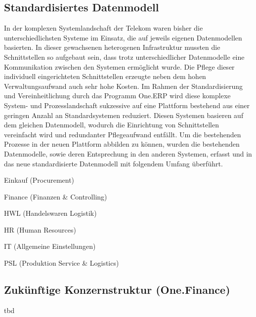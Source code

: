 \subsection{Standardisiertes Datenmodell}
In der komplexen Systemlandschaft der Telekom waren bisher die unterschiedlichsten Systeme im Einsatz, die auf jeweils eigenen Datenmodellen basierten. 
In dieser gewachsenen heterogenen Infrastruktur mussten die Schnittstellen so aufgebaut sein, dass trotz unterschiedlicher Datenmodelle eine Kommunikation zwischen den Systemen ermöglicht wurde. Die Pflege dieser individuell eingerichteten Schnittstellen erzeugte neben dem hohen Verwaltungsaufwand auch sehr hohe Kosten.
Im Rahmen der Standardisierung und Vereinheitlichung durch das Programm One.ERP wird diese komplexe System- und Prozesslandschaft sukzessive auf eine Plattform bestehend aus einer geringen Anzahl an Standardsystemen reduziert. Diesen Systemen basieren auf dem gleichen Datenmodell, wodurch die Einrichtung von Schnittstellen vereinfacht wird und redundanter Pflegeaufwand entfällt.
Um die bestehenden Prozesse in der neuen Plattform abbilden zu können, wurden die bestehenden Datenmodelle, sowie deren Entsprechung in den anderen Systemen, erfasst und in das neue standardisierte Datenmodell mit folgendem Umfang überführt. \\
\begin{compactitem}    
\item    Einkauf (Procurement)
\item    Finance (Finanzen \& Controlling)
\item    HWL (Handelswaren Logistik)
\item    HR (Human Resources)
\item    IT (Allgemeine Einstellungen)
\item    PSL (Produktion Service \& Logistics)
\end{compactitem}

\subsection{Zukünftige Konzernstruktur (One.Finance)}
tbd
